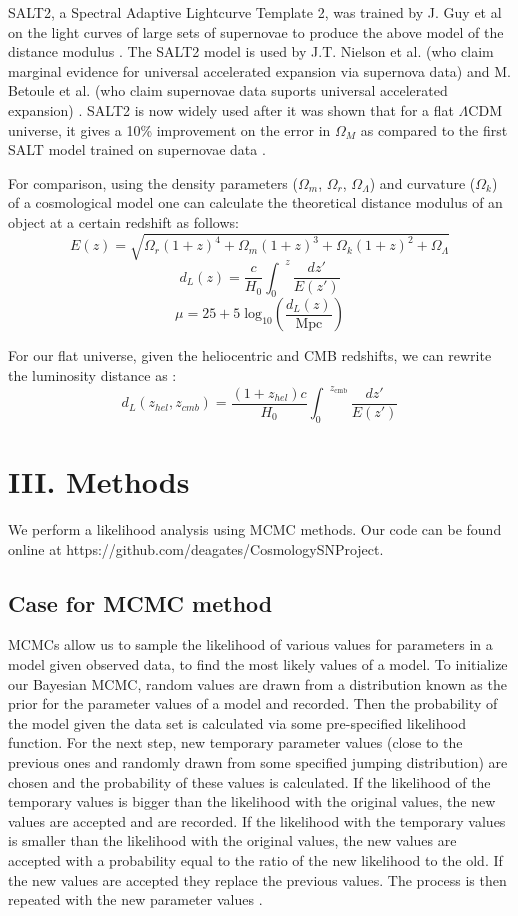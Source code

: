 \documentclass[aps,prl,reprint]{revtex4-1}
\begin{document}
SALT2, a Spectral Adaptive Lightcurve Template 2, was trained by J. Guy et al on the light curves of large sets of supernovae to produce the above model of the distance modulus \cite{salt2}. The SALT2 model is used by J.T. Nielson et al. (who claim marginal evidence for universal accelerated expansion via supernova data) and M. Betoule et al. (who claim supernovae data suports universal accelerated expansion) \cite{shocker,sdss}. SALT2 is now widely used after it was shown that for a flat $\Lambda$CDM universe, it gives a 10\% improvement on the error in $\Omega_M$ as compared to the first SALT model trained on supernovae data \cite{salt2}.

For comparison, using the density parameters ($\Omega_m$, $\Omega_{r}$, $\Omega_{\Lambda}$) and curvature ($\Omega_k$) of a cosmological model one can calculate the theoretical distance modulus of an object at a certain redshift as follows:  
$$E(z)=\sqrt{\Omega_{r}(1+z)^4 + \Omega_m(1+z)^3 + \Omega_k(1+z)^2 + \Omega_{\Lambda}} $$
$$d_L(z)=\frac{c}{H_0} {\int_0}^z \frac{dz'}{E(z')} $$
\begin{equation}
\mu = 25 + 5\;\text{log}_{10} \left( \frac{d_L(z)}{\text{Mpc}} \right) 
\end{equation}

For our flat universe, given the heliocentric and CMB redshifts, we can rewrite the luminosity distance as \cite{miao}:
$$d_L(z_{hel},z_{cmb})=\frac{(1+z_{hel}) c}{H_0}{\int_0}^{z_\text{cmb}} \frac{dz'}{E(z')}$$

\section{III. Methods}
We perform a likelihood analysis using MCMC methods. Our code can be found online at https://github.com/deagates/CosmologySNProject.
\subsection{Case for MCMC method}
MCMCs allow us to sample the likelihood of various values for parameters in a model given observed data, to find the most likely values of a model.
To initialize our Bayesian MCMC, random values are drawn from a distribution known as the prior for the parameter values of a model and recorded. Then the probability of the model given the data set is calculated via some pre-specified likelihood function. For the next step, new temporary parameter values (close to the previous ones and randomly drawn from some specified jumping distribution) are chosen and the probability of these values is calculated. If the likelihood of the temporary values is bigger than the likelihood with the original values, the new values are accepted and are recorded. If the likelihood with the temporary values is smaller than the likelihood with the original values, the new values are accepted with a probability equal to the ratio of the new likelihood to the old. If the new values are accepted they replace the previous values. The process is then repeated with the new parameter values \cite{lecture}.
\end{document}
